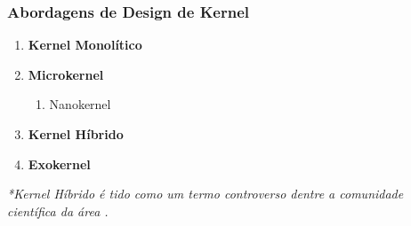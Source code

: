\documentclass{beamer}
\begin{document}
\begin{frame}[fragile]
\frametitle{Abordagens de Design de Kernel}

\begin{enumerate}\small
    \item \textbf{Kernel Monolítico}
    \item \textbf{Microkernel}
    \begin{enumerate}\footnotesize
        \item Nanokernel
    \end{enumerate}
    \item \textbf{Kernel Híbrido}
    \item \textbf{Exokernel}
\end{enumerate}

\vfill
\begin{center}
    \textit{*Kernel Híbrido é tido como um termo controverso dentre a comunidade científica da área \cite{microkernel2007}.}
\end{center}
\end{frame}
\end{document}
